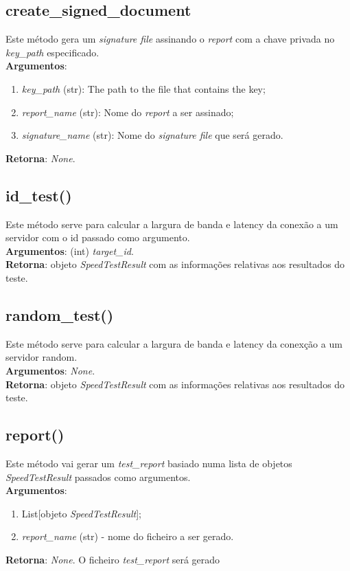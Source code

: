 \documentclass{report}
\begin{document}
\subsection{create\_signed\_document}
\hspace{5mm}Este método gera um \textit{signature file} assinando o \textit{report} com a chave privada no \textit{key\_path} especificado.\\ 
\hspace{5mm}\textbf{Argumentos}: 
\begin{enumerate}
\item \textit{key\_path} (str): The path to the file that contains the key;
\item \textit{report\_name} (str): Nome do \textit{report} a ser assinado;
\item \textit{signature\_name} (str): Nome do \textit{signature file} que será gerado.	
\end{enumerate}
\textbf{Retorna}: \textit{None}.

\subsection{id\_test()}
\hspace{5mm}Este método serve para calcular a largura de banda e latency da conexão a um servidor com o id passado como argumento.\\ 
\hspace{5mm}\textbf{Argumentos}: (int) \textit{target\_id}.\\
\textbf{Retorna}: objeto \textit{SpeedTestResult} com as informações relativas aos resultados do teste.

\subsection{random\_test()}
\hspace{5mm}Este método serve para calcular a largura de banda e latency da conexção a um servidor random.\\ 
\hspace{5mm}\textbf{Argumentos}: \textit{None}.\\
\textbf{Retorna}: objeto \textit{SpeedTestResult} com as informações relativas aos resultados do teste.

\subsection{report()}
\hspace{5mm}Este método vai gerar um \textit{test\_report} basiado numa lista de objetos \textit{SpeedTestResult} passados como argumentos.\\ 
\textbf{Argumentos}:
\begin{enumerate}
\item List[objeto \textit{SpeedTestResult}];
\item \textit{report\_name} (str) - nome do ficheiro a ser gerado.
\end{enumerate}
\textbf{Retorna}: \textit{None}. O ficheiro \textit{test\_report} será gerado
\end{document}
